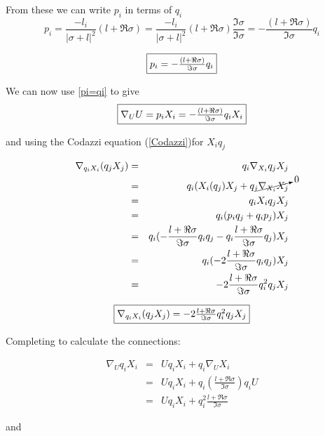 From these we can write $p_i$ in terms of $q_i$
\begin{displaymath}
p_i = \frac{-l_i}{|\sigma+l|^2}(l+\Re \sigma) = \frac{-l_i}{|\sigma+l|^2}(l+\Re \sigma) \frac{\Im \sigma}{\Im \sigma} = -\frac{(l+\Re \sigma)}{\Im \sigma}q_i
\end{displaymath} 

\begin{equation}
\framebox{$p_i =-\frac{(l+\Re \sigma)}{\Im \sigma}q_i$}
\label{pi=qi}
\end{equation}

We can now use \ref{pi=qi} to give 
\begin{equation}
\framebox{$\nabla_UU = p_iX_i = -\frac{(l+\Re \sigma)}{\Im \sigma}q_iX_i$}
\label{NUUq}
\end{equation}


and using the Codazzi  equation (\ref{Codazzi})for $X_iq_j$

\begin{eqnarray}
\nonumber
\nabla_{q_iX_i}(q_jX_j) &=& q_i \nabla_{X_i}q_jX_j \\
\nonumber
&=& q_i(X_i(q_j)X_j+q_j\cancelto{0}{\nabla_{X_i}X_j} \\
\nonumber
&=&q_iX_iq_jX_j \\
\nonumber
&=&q_i(p_iq_j+q_ip_j)X_j \\
\nonumber
&=&q_i(-\frac{l+\Re \sigma}{\Im \sigma}q_iq_j-q_i\frac{l+\Re \sigma}{\Im \sigma}q_j)X_j \\
\nonumber
&=& q_i(-2\frac{l+\Re \sigma}{\Im\sigma}q_iq_j)X_j \\
\nonumber
&=& -2\frac{l+\Re \sigma}{\Im\sigma}q_i^2q_jX_j
\end{eqnarray}

\begin{equation}
\framebox{$\nabla_{q_iX_i}(q_jX_j) = -2\frac{l+\Re \sigma}{\Im\sigma}q_i^2q_jX_j$}
\label{NqiXiqjXj}
\end{equation}

Completing to calculate the connections:

\begin{eqnarray}
\nonumber
\nabla_U q_iX_i &=& Uq_iX_i + q_i\nabla_UX_i \\
\nonumber
&=& Uq_iX_i + q_i\left(\frac{l+\Re \sigma}{\Im \sigma} \right)q_iU \\
&=& Uq_iX_i+ q_i^2 \frac{l+\Re \sigma}{\Im \sigma}
\label{NUqiXi}
\end{eqnarray}

and 

